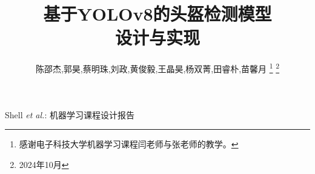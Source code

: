 \documentclass[journal]{IEEEtran}
\begin{document}
%
\title{基于YOLOv8的头盔检测模型\\设计与实现}
%
%
%

\author{陈邵杰,郭昊,蔡明珠,刘政,黄俊毅,王晶昊,杨双菁,田睿朴,苗馨月%
\thanks{感谢电子科技大学机器学习课程闫老师与张老师的教学。}%
\thanks{2024年10月}}

% 
%



%
{Shell \MakeLowercase{\textit{et al.}}: 机器学习课程设计报告}
% 
\end{document}
